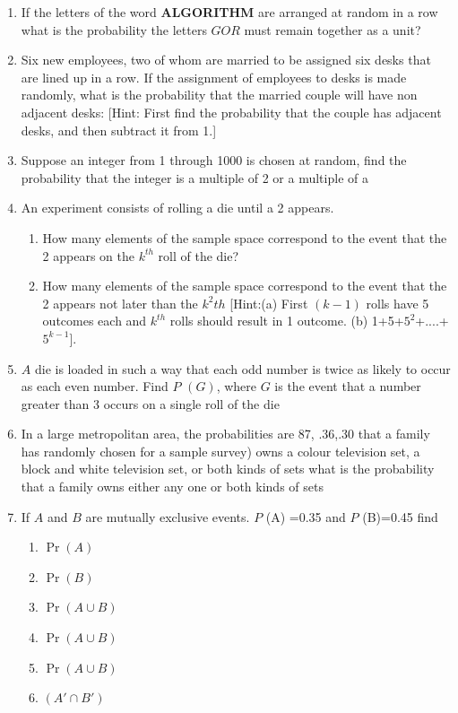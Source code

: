 \documentclass[12pt]{article}
\providecommand{\pr}[1]{\ensuremath{\Pr\left(#1\right)}}
\begin{document}
\begin{enumerate}
\item If the letters of the word \textbf{ALGORITHM} are arranged at random in a row what is the probability the letters $GOR$ must remain together as a unit?	
\item Six new employees, two of whom are married to be assigned six desks that are lined up in a row. If the assignment of employees to desks is made randomly, what is the probability that the married couple will have non adjacent desks:
[Hint: First find the probability that the couple has adjacent desks, and then subtract it from 1.]
\item Suppose an integer from 1 through 1000 is chosen at random, find the probability that the integer is a multiple of 2 or a multiple of a
\item An experiment consists of rolling a die until a 2 appears.
\begin{enumerate}
\item How many elements of the sample space correspond to the event that the 2 appears on the $k^{th}$ roll of the die?
\item How many elements of the sample space correspond to the event that the 2 appears not later than the $k^2{th}$	
[Hint:(a) First $(k-1)$ rolls have 5 outcomes each and $k^{th}$ rolls should result in 1 outcome. (b) 1+5+$5^2$+....+$5^{k-1}$].
\end{enumerate}
\item $A$ die is loaded in such a way that each odd number is twice as likely to occur as each even number. Find $P$ $(G)$, where $G$ is the event that a number greater than 3 occurs on a  single roll of the die
\item In a large metropolitan area, the probabilities are 87, .36,.30 that a family has randomly chosen for a sample survey) owns a colour television set, a block and white television set, or both kinds of sets what is the probability that a family owns either any one or both kinds of sets
\item  If $A$ and $B$ are mutually exclusive events. $P$ (A) =0.35 and $P$ (B)=0.45 find
	\begin{enumerate}	
\item $\pr{A}$
\item $\pr{B}$
\item $\pr{A\cup B}$
\item $\pr{A\cup B}$
\item $\pr{A \cup  B}$ 
\item $(A\prime\cap B\prime)$

\end{enumerate}
\end{enumerate}
\end{document}

